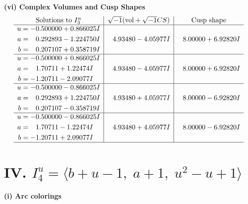 \documentclass[1p]{elsarticle_modified}
\theoremstyle{definition}
\newcommand{\I}{\sqrt{-1}}
\begin{document}
\newpage\flushleft \textbf{(vi) Complex Volumes and Cusp Shapes}
$$\begin{array}{c|c|c}  
\text{Solutions to }I^u_{3}& \I (\text{vol} + \sqrt{-1}CS) & \text{Cusp shape}\\
 \hline 
\begin{aligned}
u &= -0.500000 + 0.866025 I \\
a &= \phantom{-}0.292893 - 1.224750 I \\
b &= \phantom{-}0.207107 + 0.358719 I\end{aligned}
 & \phantom{-}4.93480 - 4.05977 I & \phantom{-}8.00000 + 6.92820 I \\ \hline\begin{aligned}
u &= -0.500000 + 0.866025 I \\
a &= \phantom{-}1.70711 + 1.22474 I \\
b &= -1.20711 - 2.09077 I\end{aligned}
 & \phantom{-}4.93480 - 4.05977 I & \phantom{-}8.00000 + 6.92820 I \\ \hline\begin{aligned}
u &= -0.500000 - 0.866025 I \\
a &= \phantom{-}0.292893 + 1.224750 I \\
b &= \phantom{-}0.207107 - 0.358719 I\end{aligned}
 & \phantom{-}4.93480 + 4.05977 I & \phantom{-}8.00000 - 6.92820 I \\ \hline\begin{aligned}
u &= -0.500000 - 0.866025 I \\
a &= \phantom{-}1.70711 - 1.22474 I \\
b &= -1.20711 + 2.09077 I\end{aligned}
 & \phantom{-}4.93480 + 4.05977 I & \phantom{-}8.00000 - 6.92820 I\\
 \hline 
 \end{array}$$\newpage\newpage\renewcommand{\arraystretch}{1}
\centering \section*{IV. $I^u_{4}= \langle b+u-1,\;a+1,\;u^2- u+1 \rangle$}
\flushleft \textbf{(i) Arc colorings}\\
\end{document}
